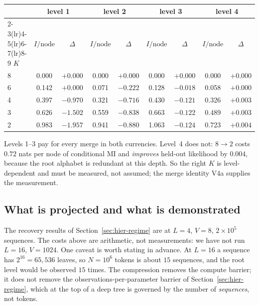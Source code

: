 \begin{center}
\begin{tabular}{lcccccccc}
\toprule
 & \multicolumn{2}{c}{level 1} & \multicolumn{2}{c}{level 2}
 & \multicolumn{2}{c}{level 3} & \multicolumn{2}{c}{level 4} \\
\cmidrule(lr){2-3}\cmidrule(lr){4-5}\cmidrule(lr){6-7}\cmidrule(lr){8-9}
$K$ & $I/\text{node}$ & $\Delta$ & $I/\text{node}$ & $\Delta$
    & $I/\text{node}$ & $\Delta$ & $I/\text{node}$ & $\Delta$ \\
\midrule
8 & 0.000 & $+0.000$ & 0.000 & $+0.000$ & 0.000 & $+0.000$ & 0.000 & $+0.000$ \\
6 & 0.142 & $+0.000$ & 0.071 & $-0.222$ & 0.128 & $-0.018$ & 0.058 & $+0.000$ \\
4 & 0.397 & $-0.970$ & 0.321 & $-0.716$ & 0.430 & $-0.121$ & 0.326 & $+0.003$ \\
3 & 0.626 & $-1.502$ & 0.559 & $-0.838$ & 0.663 & $-0.122$ & 0.489 & $+0.003$ \\
2 & 0.983 & $-1.957$ & 0.941 & $-0.880$ & 1.063 & $-0.124$ & 0.723 & $+0.004$ \\
\bottomrule
\end{tabular}
\end{center}

\noindent
Levels 1--3 pay for every merge in both currencies. Level~4 does not: $8\to2$
costs $0.72$ nats per node of conditional MI and \emph{improves} held-out
likelihood by $0.004$, because the root alphabet is redundant at this depth.
So the right $K$ is level-dependent and must be measured, not assumed; the
merge identity V4a supplies the measurement.

\subsection{What is projected and what is demonstrated}

The recovery results of Section~\ref{sec:hier-regime} are at $L=4$, $V=8$,
$2\times10^5$ sequences. The costs above are arithmetic, not measurements: we
have not run $L=16$, $V=1024$. One caveat is worth stating in advance. At
$L=16$ a sequence has $2^{16}=65{,}536$ leaves, so $N=10^6$ tokens is about
$15$ sequences, and the root level would be observed $15$ times. The
compression removes the compute barrier; it does not remove the
observations-per-parameter barrier of Section~\ref{sec:hier-regime}, which at
the top of a deep tree is governed by the number of \emph{sequences}, not
tokens.

